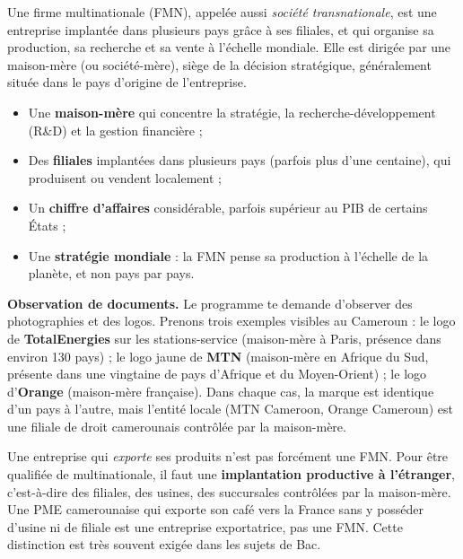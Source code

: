 \documentclass[11pt]{article}
\newcommand{\cle}[1]{{\popxbold\color{popdark}#1}}
\begin{document}
\begin{definition}
Une \cle{firme multinationale} (FMN), appelée aussi \emph{société transnationale}, est une entreprise implantée dans plusieurs pays grâce à ses \cle{filiales}, et qui organise sa production, sa recherche et sa vente à l'échelle mondiale. Elle est dirigée par une \cle{maison-mère} (ou société-mère), siège de la décision stratégique, généralement située dans le pays d'origine de l'entreprise.
\end{definition}

\begin{aretenir}
\begin{itemize}
\item Une \textbf{maison-mère} qui concentre la stratégie, la recherche-développement (R\&D) et la gestion financière ;
\item Des \textbf{filiales} implantées dans plusieurs pays (parfois plus d'une centaine), qui produisent ou vendent localement ;
\item Un \textbf{chiffre d'affaires} considérable, parfois supérieur au PIB de certains États ;
\item Une \textbf{stratégie mondiale} : la FMN pense sa production à l'échelle de la planète, et non pays par pays.
\end{itemize}
\end{aretenir}

\textbf{Observation de documents.} Le programme te demande d'observer des photographies et des logos. Prenons trois exemples visibles au Cameroun : le logo de \textbf{TotalEnergies} sur les stations-service (maison-mère à Paris, présence dans environ 130 pays) ; le logo jaune de \textbf{MTN} (maison-mère en Afrique du Sud, présente dans une vingtaine de pays d'Afrique et du Moyen-Orient) ; le logo d'\textbf{Orange} (maison-mère française). Dans chaque cas, la marque est identique d'un pays à l'autre, mais l'entité locale (MTN Cameroon, Orange Cameroun) est une filiale de droit camerounais contrôlée par la maison-mère.

\begin{attention}
Une entreprise qui \emph{exporte} ses produits n'est pas forcément une FMN. Pour être qualifiée de multinationale, il faut une \textbf{implantation productive à l'étranger}, c'est-à-dire des filiales, des usines, des succursales contrôlées par la maison-mère. Une PME camerounaise qui exporte son café vers la France sans y posséder d'usine ni de filiale est une entreprise exportatrice, pas une FMN. Cette distinction est très souvent exigée dans les sujets de Bac.
\end{attention}
\end{document}
